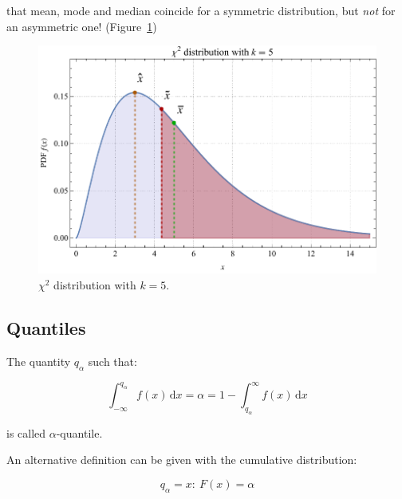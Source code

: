  that mean, mode and median coincide for a symmetric distribution, but \emph{not} for an asymmetric one! (Figure~\ref{fig:mean_mode_median_chisquare})

\begin{figure}[h]
	\includegraphics[width=\linewidth]{probability/mean_mode_median_chisquare.pdf}
	\caption[$\chi^{2}$ distribution with $k = 5$.]{$\chi^{2}$ distribution with $k = 5$.}
	\label{fig:mean_mode_median_chisquare}
\end{figure}

\subsection{Quantiles}
\label{subsec:quantile}

The quantity $q_{\alpha}$ such that:

\begin{equation}\label{eq:alpha_quantile}
	\int_{-\infty}^{q_{\alpha}} {f(x)} \,\mathrm{d}x = \alpha 
	= 1 - \int_{q_{\alpha}}^{\infty} {f(x)} \,\mathrm{d}x
\end{equation}

is called $\alpha$-quantile.

An alternative definition can be given with the cumulative distribution:

\begin{equation}
	q_{\alpha} = x : \ F(x) = \alpha
\end{equation}